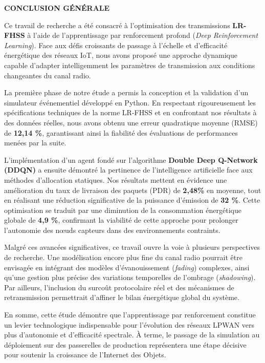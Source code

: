 \newpage
\begin{center}
	{\Large \textbf{CONCLUSION GÉNÉRALE}}
\end{center}

\vspace{0.5cm}
Ce travail de recherche a été consacré à l'optimisation des transmissions \textbf{LR-FHSS} à l'aide de l'apprentissage par renforcement profond (\textit{Deep Reinforcement Learning}). Face aux défis croissants de passage à l'échelle et d'efficacité énergétique des réseaux IoT, nous avons proposé une approche dynamique capable d'adapter intelligemment les paramètres de transmission aux conditions changeantes du canal radio.

La première phase de notre étude a permis la conception et la validation d'un simulateur événementiel développé en Python. En respectant rigoureusement les spécifications techniques de la norme LR-FHSS et en confrontant nos résultats à des données réelles, nous avons obtenu une erreur quadratique moyenne (RMSE) de \textbf{12,14 \%}, garantissant ainsi la fiabilité des évaluations de performances menées par la suite.

L'implémentation d'un agent fondé sur l'algorithme \textbf{Double Deep Q-Network (DDQN)} a ensuite démontré la pertinence de l'intelligence artificielle face aux méthodes d'allocation statiques. Nos résultats mettent en évidence une amélioration du taux de livraison des paquets (PDR) de \textbf{2,48\%} en moyenne, tout en réalisant une réduction significative de la puissance d'émission de \textbf{32 \%}. Cette optimisation se traduit par une diminution de la consommation énergétique globale de \textbf{4,9 \%}, confirmant la viabilité de cette approche pour prolonger l'autonomie des nœuds capteurs dans des environnements contraints.

Malgré ces avancées significatives, ce travail ouvre la voie à plusieurs perspectives de recherche. Une modélisation encore plus fine du canal radio pourrait être envisagée en intégrant des modèles d'évanouissement (\textit{fading}) complexes, ainsi qu'une gestion plus précise des variations temporelles de l'ombrage (\textit{shadowing}). Par ailleurs, l'inclusion du surcoût protocolaire réel et des mécanismes de retransmission permettrait d'affiner le bilan énergétique global du système.

En somme, cette étude démontre que l'apprentissage par renforcement constitue un levier technologique indispensable pour l'évolution des réseaux LPWAN vers plus d'autonomie et d'efficacité spectrale. À terme, le passage de la simulation au déploiement sur des passerelles de production représentera une étape décisive pour soutenir la croissance de l'Internet des Objets.